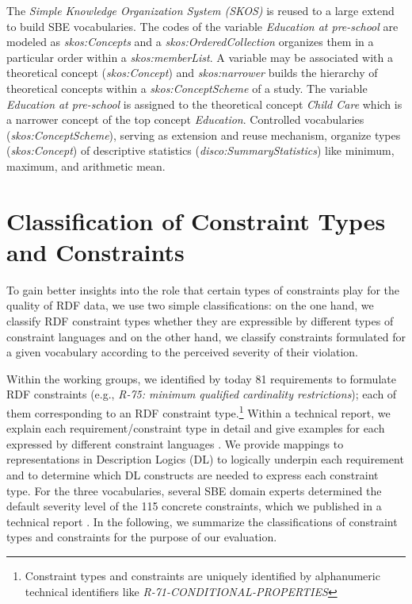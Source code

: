 \documentclass{llncs}
\begin{document}
The \emph{Simple Knowledge Organization System (SKOS)} is reused to a large extend to build SBE vocabularies.
The codes of the variable \emph{Education at pre-school} are modeled as \emph{skos:Concepts} and 
a \emph{skos:OrderedCollection} organizes them in a particular order within a \emph{skos:memberList}.
A variable may be associated with a theoretical concept (\emph{skos:Concept}) and \emph{skos:narrower} builds the hierarchy of theoretical concepts within a \emph{skos:ConceptScheme} of a study.
The variable \emph{Education at pre-school} is assigned to the theoretical concept \emph{Child Care} which is a narrower concept of the top concept \emph{Education}.
Controlled vocabularies (\emph{skos:ConceptScheme}), serving as extension and reuse mechanism,
organize types (\emph{skos:Concept}) of descriptive statistics (\emph{disco:SummaryStatistics}) like minimum, maximum, and arithmetic mean.

\section{Classification of Constraint Types and Constraints}
\label{classification}

To gain better insights into the role that certain types of constraints play for the quality of RDF data, we use two simple classifications: on the one hand, we classify RDF constraint types whether they are expressible by different types of constraint languages and on the other hand, we classify constraints formulated for a given vocabulary according to the perceived severity of their violation. 

Within the working groups, we identified by today 81 requirements to formulate RDF constraints (e.g., \emph{R-75: minimum qualified cardinality restrictions}); each of them corresponding to an RDF constraint type.\footnote{Constraint types and constraints are uniquely identified by alphanumeric technical identifiers like \emph{R-71-CONDITIONAL-PROPERTIES}} 
Within a technical report, we explain each requirement/constraint type in detail and give examples for each expressed by different constraint languages \cite{BoschNolleAcarEckert2015}. We provide mappings to representations in Description Logics (DL) \cite{Baader-2003} to logically underpin each requirement and to determine which DL constructs are needed to express each constraint type.
For the three vocabularies, several SBE domain experts determined the default severity level of the 115 concrete constraints, which we published in a technical report \cite{BoschZapilkoWackerowEckert2015}.
In the following, we summarize the classifications of constraint types and constraints for the purpose of our evaluation.
\end{document}
